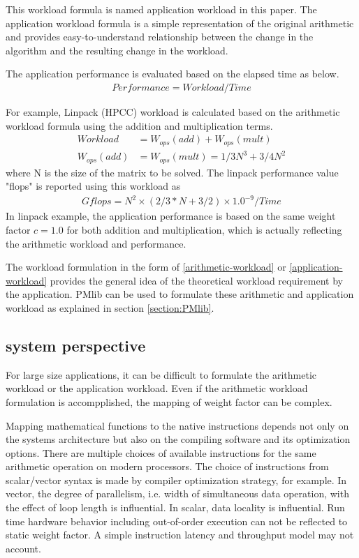 \documentclass[conference]{IEEEtran}
\begin{document}
This workload formula is named application workload in this paper.
The application workload formula is a simple representation of the original
arithmetic and provides easy-to-understand relationship between the change
in the algorithm and the resulting change in the workload.

The application performance is evaluated based on the elapsed time as below.
\begin{align}\label{eq:performance-workload-time}
Performance = Workload / Time 
\end{align}

For example, Linpack (HPCC) 
\cite{}
workload is calculated based on the arithmetic workload formula
using the addition and multiplication terms.
\begin{align}
		Workload & = W_{ops}(add) + W_{ops}(mult) \\
		W_{ops}(add) & = W_{ops}(mult) = 1/3 N^{3} + 3/4 N^{2}
\end{align}
where N is the size of the matrix to be solved.
The linpack performance value "flops" is reported using this workload as
\begin{align*}
Gflops = N^{2} \times ( 2/3 * N + 3/2 ) \times 1.0^{-9} / Time 
\end{align*}
In linpack example, the application performance is based on
the same weight factor $ c = 1.0 $ 
for both addition and multiplication, which is actually reflecting the
arithmetic workload and performance.

The workload formulation in the form of
\eqref{arithmetic-workload}
or
\eqref{application-workload}
provides the general idea of the theoretical workload requirement by the
application.
PMlib can be used to formulate these arithmetic and application workload
as explained in section \ref{section:PMlib}.

\subsection{system perspective}
\label{subsection:system-perspective}

For large size applications, it can be difficult to formulate
the arithmetic workload or the application workload.
Even if the arithmetic workload formulation is accompplished,
the mapping of weight factor can be complex.

Mapping mathematical functions to the native instructions
depends not only on the systems architecture but also on the compiling
software and its optimization options.
There are multiple choices of available instructions for the same
arithmetic operation on modern processors.
The choice of instructions from scalar/vector syntax is made by
compiler optimization strategy, for example.
In vector, the degree of parallelism, i.e. width of simultaneous data
operation, with the effect of loop length is influential.
In scalar, data locality is influential.
Run time hardware behavior including out-of-order execution can not
be reflected to static weight factor.
A simple instruction latency and throughput model may not account.
\end{document}

